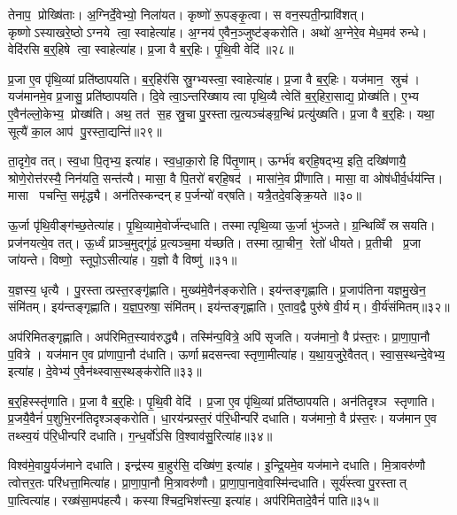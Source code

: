 तेनाप॒ प्रोख्षि॑ताः। अ॒ग्निर्दे॒वेभ्यो॒ निला॑यत। कृष्णो॑ रू॒पङ्कृ॒त्वा। स वन॒स्पती॒न्प्रावि॑शत्। कृष्णोऽस्याखरे॒ष्ठोऽग्नये त्वा॒ स्वाहेत्या॑ह। अ॒ग्नय॑ ए॒वैन॒ञ्जुष्ट॑ङ्करोति। अथो॑ अ॒ग्नेरे॒व मेध॒मव॑ रुन्धे। वेदि॑रसि ब॒र्॒हिषे त्वा॒ स्वाहेत्या॑ह। प्र॒जा वै ब॒र्॒हिः। पृ॒थि॒वी वेदि॑॥२८॥

प्र॒जा ए॒व पृ॑थि॒व्यां प्रति॑ष्ठापयति। ब॒र्॒हिर॑सि स्रु॒ग्भ्यस्त्वा॒ स्वाहेत्या॑ह। प्र॒जा वै ब॒र्॒हिः। यज॑मान॒ स्रुच॑। यज॑मानमे॒व प्र॒जासु॒ प्रति॑ष्ठापयति। दि॒वे त्वा॒ऽन्तरि॑ख्षाय त्वा पृथि॒व्यै त्वेति॑ ब॒र्॒हिरा॒साद्य॒ प्रोख्ष॑ति। ए॒भ्य ए॒वैन॑ल्लो॒केभ्य॒ प्रोख्ष॑ति। अथ॒ तत॑ स॒ह स्रु॒चा पु॒रस्तात्प्र॒त्यञ्च॑ङ्ग्र॒न्थिं प्रत्यु॑ख्षति। प्र॒जा वै ब॒र्॒हिः। यथा॒ सूत्यै॑ का॒ल आप॑ पु॒रस्ता॒द्यन्ति॑॥२९॥

ता॒दृगे॒व तत्। स्व॒धा पि॒तृभ्य॒ इत्या॑ह। स्व॒धा॒का॒रो हि पि॑तृ॒णाम्। ऊर्ग्भ॑व बर्‌हि॒षद्भ्य॒ इति॒ दख्षि॑णायै॒ श्रोणे॒रोत्त॑रस्यै॒ निन॑यति॒ सन्त॑त्यै। मासा॒ वै पि॒तरो॑ बर्‌हि॒षद॑। मासा॑ने॒व प्री॑णाति। मासा॒ वा ओष॑धीर्व॒र्धय॑न्ति। मासा पचन्ति॒ समृ॑द्ध्यै। अन॑तिस्कन्दन् ह प॒र्जन्यो॑ वर्‌षति। यत्रै॒तदे॒वङ्क्रि॒यते॥३०॥

ऊ॒र्जा पृ॑थि॒वीङ्ग॑च्छ॒तेत्या॑ह। पृ॒थि॒व्यामे॒वोर्ज॑न्दधाति। तस्मात्पृथि॒व्या ऊ॒र्जा भु॑ञ्जते। ग्र॒न्थिव्विँ स्रसयति। प्रज॑नयत्ये॒व तत्। ऊ॒र्ध्वं प्राञ्च॒मुद्गू॑ढं प्र॒त्यञ्च॒मा य॑च्छति। तस्मात्प्रा॒चीन॒ रेतो॑ धीयते। प्र॒तीची प्र॒जा जा॑यन्ते। विष्णो॒ स्तूपो॒ऽसीत्या॑ह। य॒ज्ञो वै विष्णु॑॥३१॥

य॒ज्ञस्य॒ धृत्यै। पु॒रस्तात्प्रस्त॒रङ्गृ॑ह्णाति। मुख्य॑मे॒वैन॑ङ्करोति। इय॑न्तङ्गृह्णाति। प्र॒जाप॑तिना यज्ञमु॒खेन॒ संमि॑तम्। इय॑न्तङ्गृह्णाति। य॒ज्ञ॒प॒रुषा॒ संमि॑तम्। इय॑न्तङ्गृह्णाति। ए॒ताव॒द्वै पुरु॑षे वी॒र्यम्। वी॒र्य॑संमितम्॥३२॥

अप॑रिमितङ्गृह्णाति। अप॑रिमित॒स्याव॑रुद्ध्यै। तस्मि॑न्प॒वित्रे॒ अपि॑ सृजति। यज॑मानो॒ वै प्र॑स्त॒रः। प्रा॒णा॒पा॒नौ प॒वित्रे। यज॑मान ए॒व प्रा॑णापा॒नौ द॑धाति। ऊर्णाम्रदसन्त्वा स्तृणा॒मीत्या॑ह। य॒था॒य॒जुरे॒वैतत्। स्वा॒स॒स्थन्दे॒वेभ्य॒ इत्या॑ह। दे॒वेभ्य॑ ए॒वैन॑थ्स्वास॒स्थङ्क॑रोति॥३३॥

ब॒र्॒हिस्स्तृ॑णाति। प्र॒जा वै ब॒र्॒हिः। पृ॒थि॒वी वेदि॑। प्र॒जा ए॒व पृ॑थि॒व्यां प्रति॑ष्ठापयति। अन॑तिदृश्ञ स्तृणाति। प्र॒जयै॒वैनं॑ प॒शुभि॒रन॑तिदृश्ञङ्करोति। धा॒रय॑न्प्रस्त॒रं प॑रि॒धीन्परि॑ दधाति। यज॑मानो॒ वै प्र॑स्त॒रः। यज॑मान ए॒व तथ्स्व॒यं प॑रि॒धीन्परि॑ दधाति। ग॒न्ध॒र्वो॑ऽसि वि॒श्वाव॑सु॒रित्या॑ह॥३४॥

विश्व॑मे॒वायु॒र्यज॑माने दधाति। इन्द्र॑स्य बा॒हुर॑सि॒ दख्षि॑ण॒ इत्या॑ह। इ॒न्द्रि॒यमे॒व यज॑माने दधाति। मि॒त्रावरु॑णौ त्वोत्तर॒तः परि॑धत्ता॒मित्या॑ह। प्रा॒णा॒पा॒नौ मि॒त्रावरु॑णौ। प्रा॒णा॒पा॒नावे॒वास्मि॑न्दधाति। सूर्य॑स्त्वा पु॒रस्तात् पा॒त्वित्या॑ह। रख्ष॑सा॒मप॑हत्यै। कस्याश्चिद॒भिश॑स्त्या॒ इत्या॑ह। अप॑रिमितादे॒वैनं॑ पाति॥३५॥

